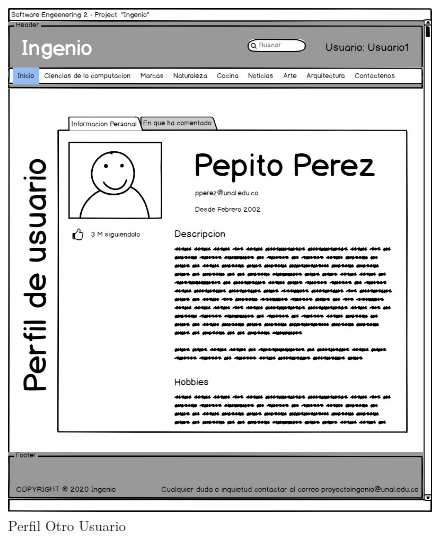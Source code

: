 \documentclass[a4paper,12 pt]{article}
\begin{document}
\begin{figure}[H]
    \centering
    \includegraphics[scale = 0.7]{images/PerfilOtroUsuario.jpg}
    \caption{Perfil Otro Usuario}
    \label{F106}
\end{figure}{}
\end{document}
